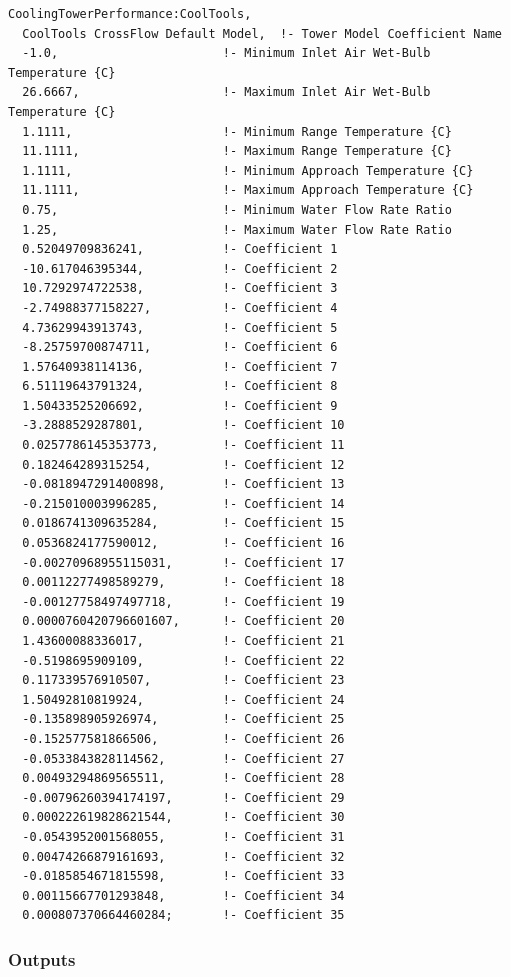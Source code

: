 \begin{lstlisting}
CoolingTowerPerformance:CoolTools,
  CoolTools CrossFlow Default Model,  !- Tower Model Coefficient Name
  -1.0,                       !- Minimum Inlet Air Wet-Bulb Temperature {C}
  26.6667,                    !- Maximum Inlet Air Wet-Bulb Temperature {C}
  1.1111,                     !- Minimum Range Temperature {C}
  11.1111,                    !- Maximum Range Temperature {C}
  1.1111,                     !- Minimum Approach Temperature {C}
  11.1111,                    !- Maximum Approach Temperature {C}
  0.75,                       !- Minimum Water Flow Rate Ratio
  1.25,                       !- Maximum Water Flow Rate Ratio
  0.52049709836241,           !- Coefficient 1
  -10.617046395344,           !- Coefficient 2
  10.7292974722538,           !- Coefficient 3
  -2.74988377158227,          !- Coefficient 4
  4.73629943913743,           !- Coefficient 5
  -8.25759700874711,          !- Coefficient 6
  1.57640938114136,           !- Coefficient 7
  6.51119643791324,           !- Coefficient 8
  1.50433525206692,           !- Coefficient 9
  -3.2888529287801,           !- Coefficient 10
  0.0257786145353773,         !- Coefficient 11
  0.182464289315254,          !- Coefficient 12
  -0.0818947291400898,        !- Coefficient 13
  -0.215010003996285,         !- Coefficient 14
  0.0186741309635284,         !- Coefficient 15
  0.0536824177590012,         !- Coefficient 16
  -0.00270968955115031,       !- Coefficient 17
  0.00112277498589279,        !- Coefficient 18
  -0.00127758497497718,       !- Coefficient 19
  0.0000760420796601607,      !- Coefficient 20
  1.43600088336017,           !- Coefficient 21
  -0.5198695909109,           !- Coefficient 22
  0.117339576910507,          !- Coefficient 23
  1.50492810819924,           !- Coefficient 24
  -0.135898905926974,         !- Coefficient 25
  -0.152577581866506,         !- Coefficient 26
  -0.0533843828114562,        !- Coefficient 27
  0.00493294869565511,        !- Coefficient 28
  -0.00796260394174197,       !- Coefficient 29
  0.000222619828621544,       !- Coefficient 30
  -0.0543952001568055,        !- Coefficient 31
  0.00474266879161693,        !- Coefficient 32
  -0.0185854671815598,        !- Coefficient 33
  0.00115667701293848,        !- Coefficient 34
  0.000807370664460284;       !- Coefficient 35
\end{lstlisting}

\subsubsection{Outputs}\label{outputs-4-001}

